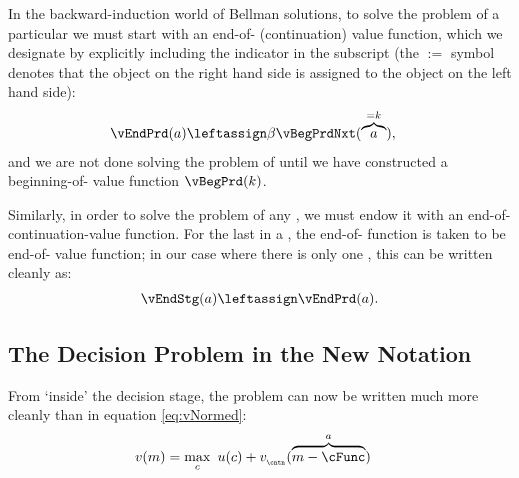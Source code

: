   In the backward-induction world of Bellman solutions, to solve the problem of a particular {\interval} we must start with an end-of-{\interval} (continuation) value function, which we designate by explicitly including the {\interval} indicator in the subscript (the $:=$ symbol denotes that the object on the right hand side is assigned to the object on the left hand side):
  \begin{equation}\begin{gathered}\begin{aligned}
        \vEndPrd(\aNrm) & \leftassign \DiscFac \vBegPrdNxt(\overbrace{\aNrm}^{=\kNrm}), \label{eq:trns-single-prd}
  \end{aligned}\end{gathered}\end{equation}
and we are not done solving the problem of {\interval} {\prd} until we have constructed a beginning-of-{\interval} value function $\vBegPrd(\kNrm)$.

Similarly, in order to solve the problem of any {\stg}, we must endow it with an end-of-{\stg} continuation-value function.  For the last {\stg} in a {\interval}, the end-of-{\stg} function is taken to be end-of-{\interval} value function; in our case where there is only one {\stg}, this can be written cleanly as:
  \begin{equation}\begin{gathered}\begin{aligned}
        \vEndStg(\aNrm) \leftassign \vEndPrd(\aNrm).
      \end{aligned}\end{gathered}\end{equation}
\subsection{The Decision Problem in the New Notation}\label{subsec:decision-problem}\hypertarget{decision-problem}{}

From `inside' the decision stage, the {\Decision} problem can now be written much more cleanly than in equation \eqref{eq:vNormed}:
  \begin{equation}\begin{gathered}\begin{aligned}
        \vFunc(\mNrm) & = \max_{\cNrm}~ \uFunc(\cNrm) + \vFunc_{_\cntn}(\overbrace{\mNrm-\cFunc}^{\aNrm}) \label{eq:vMid}
      \end{aligned}\end{gathered}\end{equation}

